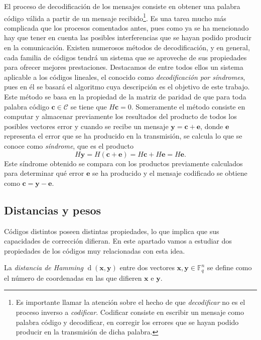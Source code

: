 El proceso de decodificación de los mensajes consiste en obtener una palabra código válida a partir de un mensaje recibido\footnote{Es importante llamar la atención sobre el hecho de que \textit{decodificar} no es el proceso inverso a \textit{codificar}. Codificar consiste en escribir un mensaje como palabra código y decodificar, en corregir los errores que se hayan podido producir en la transmisión de dicha palabra.}. 
Es una tarea mucho más complicada que los procesos comentados antes, pues como ya se ha mencionado hay que tener en cuenta las posibles interferencias que se hayan podido producir en la comunicación.
Existen numerosos métodos de decodificación, y en general, cada familia de códigos tendrá un sistema que se aproveche de sus propiedades para ofrecer mejores prestaciones.
Destacamos de entre todos ellos un sistema aplicable a los códigos lineales, el conocido como \emph{decodificación por síndromes}, pues en él se basará el algoritmo cuya descripción es el objetivo de este trabajo.
Este método se basa en la propiedad de la matriz de paridad de que para toda palabra código \(\mathbf{c} \in \mathcal C\) se tiene que \(H \mathbf{c} = 0\).
Someramente el método consiste en computar y almacenar previamente los resultados del producto de todos los posibles vectores error y cuando se recibe un mensaje \(\mathbf{y} = \mathbf{c} + \mathbf{e}\), donde \(\mathbf{e}\) representa el error que se ha producido en la transmisión, se calcula lo que se conoce como \emph{síndrome}, que es el producto
\[
  H \mathbf{y} = H(\mathbf{c} + \mathbf{e}) = H \mathbf{c} + H \mathbf{e} = H \mathbf{e}.
\]
Este síndrome obtenido se compara con los productos previamente calculados para determinar qué error \(\mathbf{e}\) se ha producido y el mensaje codificado se obtiene como \(\mathbf{c} = \mathbf{y} - \mathbf{e}\).

\subsection{Distancias y pesos}

Códigos distintos poseen distintas propiedades, lo que implica que sus capacidades de corrección difieran.
En este apartado vamos a estudiar dos propiedades de los códigos muy relacionadas con esta idea.

\begin{definition}
  La \textit{distancia de Hamming} \(\operatorname{d}(\symbf{x}, \symbf{y})\) entre dos vectores \(\symbf{x}, \symbf{y} \in \mathbb F_q^n\) se define como el número de coordenadas en las que difieren \(\symbf{x}\) e \(\symbf{y}\).
\end{definition}

